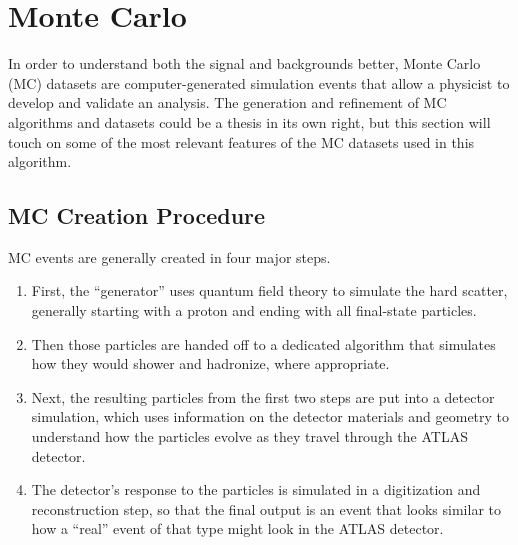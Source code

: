  

\chapter[MonteCarlo]{Monte Carlo}

In order to understand both the signal and backgrounds better, Monte Carlo (MC) datasets are computer-generated simulation events that allow a physicist to develop and validate an analysis.  The generation and refinement of MC algorithms and datasets could be a thesis in its own right, but this section will touch on some of the most relevant features of the MC datasets used in this algorithm.


\section{MC Creation Procedure}
\label{sec:mc-gen-overview}
MC events are generally created in four major steps.  
\begin{enumerate}
    \item First, the ``generator'' uses quantum field theory to simulate the hard scatter, generally starting with a proton and ending with all final-state particles.  
    \item Then those particles are handed off to a dedicated algorithm that simulates how they would shower and hadronize, where appropriate.  
    \item Next, the resulting particles from the first two steps are put into a detector simulation, which uses information on the detector materials and geometry to understand how the particles evolve as they travel through the ATLAS detector.  
    \item The detector's response to the particles is simulated in a digitization and reconstruction step, so that the final output is an event that looks similar to how a ``real'' event of that type might look in the ATLAS detector. 
\end{enumerate} 

